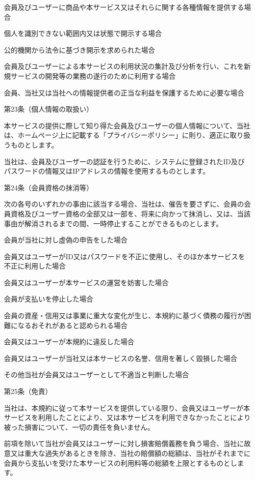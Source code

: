         会員及びユーザーに商品や本サービス又はそれらに関する各種情報を提供する場合

        個人を識別できない範囲内又は状態で開示する場合

        公的機関から法令に基づき開示を求められた場合

        会員及びユーザーによる本サービスの利用状況の集計及び分析を行い、これを新規サービスの開発等の業務の遂行のために利用する場合

        会員、当社又は当社への情報提供者の正当な利益を保護するために必要な場合

第23条（個人情報の取扱い）

    本サービスの提供に際して知り得た会員及びユーザーの個人情報について、当社は、ホームページ上に記載する「プライバシーポリシー」に則り、適正に取り扱うものとします。

    当社は、会員及びユーザーの認証を行うために、システムに登録されたID及びパスワードの情報又はIPアドレスの情報を使用するものとします。

第24条（会員資格の抹消等）

    次の各号のいずれかの事由に該当する場合、当社は、催告を要さずに、会員の会員資格及びユーザー資格の全部又は一部を、将来に向かって抹消し、又は、当該事由が解消されるまでの間、一時停止することができるものとします。

        会員が当社に対し虚偽の申告をした場合

        会員又はユーザーがID又はパスワードを不正に使用し、そのほか本サービスを不正に利用した場合

        会員又はユーザーが本サービスの運営を妨害した場合

        会員が支払いを停止した場合

        会員の資産・信用又は事業に重大な変化が生じ、本規約に基づく債務の履行が困難になるおそれがあると認められる場合

        会員又はユーザーが本規約に違反した場合

        会員又はユーザーが当社又は本サービスの名誉、信用を著しく毀損した場合

        その他当社が会員又はユーザーとして不適当と判断した場合

第25条（免責）

    当社は、本規約に従って本サービスを提供している限り、会員又はユーザーが本サービスを利用したことにより、又は本サービスを利用できなかったことにより被った損害について、一切の責任を負いません。

    前項を除いて当社が会員又はユーザーに対し損害賠償義務を負う場合、当社に故意又は重大な過失があるときを除き、当社の賠償額の総額は、当社がそれまでに会員から支払いを受けた本サービスの利用料等の総額を上限とするものとします。

